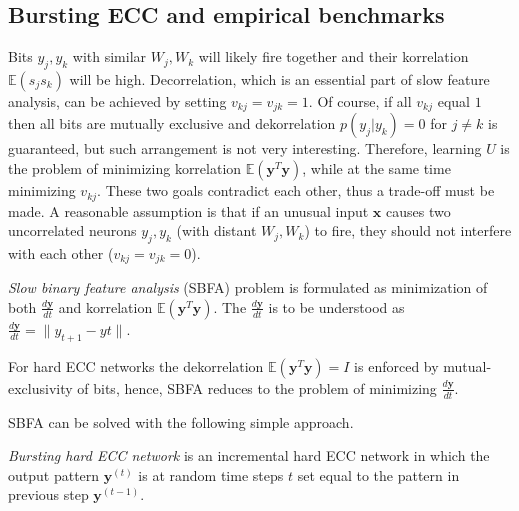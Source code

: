 \documentclass[oneside,english,logo]{amuthesis}
\begin{document}
\subsection{Bursting ECC and empirical benchmarks}
Bits $y_j,y_k$ with similar $W_j,W_k$ will likely fire together and their korrelation $\mathbb{E}(s_j s_k)$ will be high. Decorrelation, which is an essential part of slow feature analysis, can be achieved by setting $v_{kj}=v_{jk}=1$. Of course, if all $v_{kj}$ equal $1$ then all bits are mutually exclusive and dekorrelation $p(y_j|y_k) = 0$ for $j\ne k$ is guaranteed, but such arrangement is not very interesting. Therefore, learning $U$ is the problem of minimizing korrelation $\mathbb{E}(\boldsymbol{y}^T \boldsymbol{y})$, while at the same time minimizing $v_{kj}$. These two goals contradict each other, thus a trade-off  must be made. A reasonable assumption is that if an unusual input $\boldsymbol{x}$ causes two uncorrelated neurons $y_j,y_k$ (with distant $W_j,W_k$) to fire, they should not interfere with each other ($v_{kj}=v_{jk}=0$). 
\begin{definition}
	\textit{Slow binary feature analysis} (SBFA) problem is formulated as minimization of both $\frac{d\boldsymbol{y}}{dt}$ and korrelation $\mathbb{E}(\boldsymbol{y}^T \boldsymbol{y})$.  The $\frac{d\boldsymbol{y}}{dt}$ is to be understood as $\frac{d\boldsymbol{y}}{dt}=\lVert y_{t+1}-y{t} \rVert$.
\end{definition}
\begin{corollary}
For hard ECC networks the dekorrelation $\mathbb{E}(\boldsymbol{y}^T \boldsymbol{y})=I$ is enforced by mutual-exclusivity of bits, hence, SBFA reduces to the problem of minimizing $\frac{d\boldsymbol{y}}{dt}$. 
\end{corollary}
SBFA can be solved with the following simple approach.
\begin{definition}
	\textit{Bursting hard ECC network} is an incremental hard ECC network in which the output pattern $\boldsymbol{y}^{(t)}$ is at random time steps $t$ set equal to the pattern in previous step $\boldsymbol{y}^{(t-1)}$. 
\end{definition}
\end{document}
